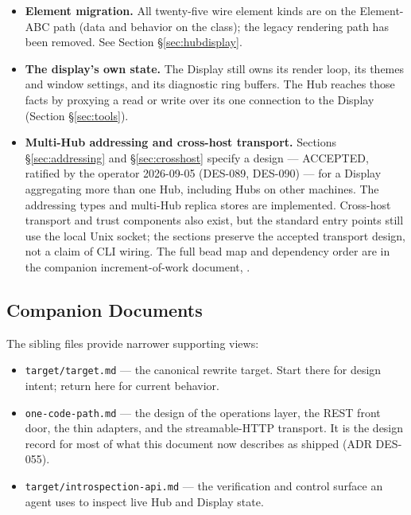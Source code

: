 \documentclass[a4paper,10pt]{article}
\begin{document}
\begin{itemize}
  \item \textbf{Element migration.} All twenty-five wire element
    kinds are on the Element-ABC path (data and behavior on the class);
    the legacy rendering path has been removed.
    See Section \S\ref{sec:hubdisplay}.
  \item \textbf{The display's own state.}  The Display still owns its
    render loop, its themes and window settings, and its diagnostic ring
    buffers.  The Hub reaches those facts by proxying a read or write over
    its one connection to the Display (Section \S\ref{sec:tools}).
  \item \textbf{Multi-Hub addressing and cross-host transport.}  Sections
    \S\ref{sec:addressing} and \S\ref{sec:crosshost} specify a design ---
    ACCEPTED, ratified by the operator 2026-09-05 (DES-089, DES-090) ---
    for a Display aggregating more than one Hub, including Hubs on
    other machines. The addressing types and multi-Hub replica stores are
    implemented. Cross-host transport and trust components also exist, but
    the standard entry points still use the local Unix socket; the sections
    preserve the accepted transport design, not a claim of CLI wiring.
    The full bead map and dependency order are in the companion
    increment-of-work document,
    .
\end{itemize}

\subsection{Companion Documents}

The sibling files provide narrower supporting views:

\begin{itemize}
  \item \texttt{target/target.md} --- the canonical rewrite target.  Start
    there for design intent; return here for current behavior.
  \item \texttt{one-code-path.md} --- the design of the operations layer,
    the REST front door, the thin adapters, and the streamable-HTTP
    transport.  It is the design record for most of what this document
    now describes as shipped (ADR DES-055).
  \item \texttt{target/introspection-api.md} --- the verification and
    control surface an agent uses to inspect live Hub and Display state.
\end{itemize}
\end{document}
